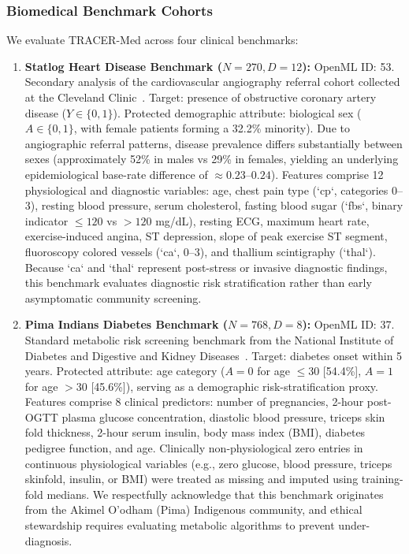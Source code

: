 \documentclass[pdflatex,sn-vancouver-num,referee,lineno]{sn-jnl}
\theoremstyle{thmstyleone}
\theoremstyle{thmstylethree}
\begin{document}
\subsubsection{Biomedical Benchmark Cohorts}
We evaluate TRACER-Med across four clinical benchmarks:
\begin{enumerate}
    \item \textbf{Statlog Heart Disease Benchmark ($N=270, D=12$):} OpenML ID: 53. Secondary analysis of the cardiovascular angiography referral cohort collected at the Cleveland Clinic~\cite{detrano1989international}. Target: presence of obstructive coronary artery disease ($Y \in \{0, 1\}$). Protected demographic attribute: biological sex ($A \in \{0, 1\}$, with female patients forming a 32.2\% minority). Due to angiographic referral patterns, disease prevalence differs substantially between sexes (approximately 52\% in males vs 29\% in females, yielding an underlying epidemiological base-rate difference of $\approx 0.23$--$0.24$). Features comprise 12 physiological and diagnostic variables: age, chest pain type (`cp`, categories 0--3), resting blood pressure, serum cholesterol, fasting blood sugar (`fbs`, binary indicator $\le 120$ vs $>120$ mg/dL), resting ECG, maximum heart rate, exercise-induced angina, ST depression, slope of peak exercise ST segment, fluoroscopy colored vessels (`ca`, 0--3), and thallium scintigraphy (`thal`). Because `ca` and `thal` represent post-stress or invasive diagnostic findings, this benchmark evaluates diagnostic risk stratification rather than early asymptomatic community screening.
    \item \textbf{Pima Indians Diabetes Benchmark ($N=768, D=8$):} OpenML ID: 37. Standard metabolic risk screening benchmark from the National Institute of Diabetes and Digestive and Kidney Diseases~\cite{smith1988using}. Target: diabetes onset within 5 years. Protected attribute: age category ($A = 0$ for age $\le 30$ [54.4\%], $A = 1$ for age $> 30$ [45.6\%]), serving as a demographic risk-stratification proxy. Features comprise 8 clinical predictors: number of pregnancies, 2-hour post-OGTT plasma glucose concentration, diastolic blood pressure, triceps skin fold thickness, 2-hour serum insulin, body mass index (BMI), diabetes pedigree function, and age. Clinically non-physiological zero entries in continuous physiological variables (e.g., zero glucose, blood pressure, triceps skinfold, insulin, or BMI) were treated as missing and imputed using training-fold medians. We respectfully acknowledge that this benchmark originates from the Akimel O'odham (Pima) Indigenous community, and ethical stewardship requires evaluating metabolic algorithms to prevent under-diagnosis.

\end{enumerate}
\end{document}

